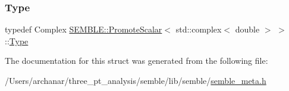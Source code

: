 \mbox{\label{structSEMBLE_1_1PromoteScalar_3_01std_1_1complex_3_01double_01_4_01_4_a6d68c9c50d91afabefeba4274aa9f41d}} 
\subsubsection{\texorpdfstring{Type}{Type}\hspace{0.1cm}{\footnotesize\ttfamily [2/2]}}
{\footnotesize\ttfamily typedef Complex \mbox{\hyperlink{structSEMBLE_1_1PromoteScalar}{S\+E\+M\+B\+L\+E\+::\+Promote\+Scalar}}$<$ std\+::complex$<$ double $>$ $>$\+::\mbox{\hyperlink{structSEMBLE_1_1PromoteScalar_3_01std_1_1complex_3_01double_01_4_01_4_a6d68c9c50d91afabefeba4274aa9f41d}{Type}}}



The documentation for this struct was generated from the following file\+:\begin{DoxyCompactItemize}
\item 
/\+Users/archanar/three\+\_\+pt\+\_\+analysis/semble/lib/semble/\mbox{\hyperlink{lib_2semble_2semble__meta_8h}{semble\+\_\+meta.\+h}}\end{DoxyCompactItemize}
